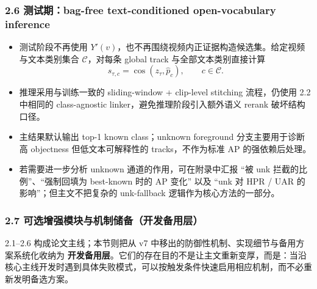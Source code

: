 \documentclass[UTF8]{ctexart}
\begin{document}
\subsubsection*{2.6 测试期：bag-free text-conditioned open-vocabulary inference}
\begin{itemize}
\item 测试阶段不再使用 $Y'(v)$，也不再围绕视频内正证据构造候选集。给定视频与文本类别集合 $\mathcal C$，对每条 global track 与全部文本类别直接计算
\[
 s_{\tau,c}=\cos(z_\tau,\hat p_c),\qquad c\in\mathcal C.
\]
\item 推理采用与训练一致的 sliding-window + clip-level stitching 流程，仍使用 2.2 中相同的 class-agnostic linker，避免推理阶段引入额外语义 rerank 破坏结构口径。
\item 主结果默认输出 top-1 known class；unknown foreground 分支主要用于诊断高 objectness 但低文本可解释性的 tracks，不作为标准 AP 的强依赖后处理。
\item 若需要进一步分析 unknown 通道的作用，可在附录中汇报 ``被 unk 拦截的比例''、``强制回填为 best-known 时的 AP 变化'' 以及 ``unk 对 HPR / UAR 的影响''；但主文不把复杂的 unk-fallback 逻辑作为核心方法的一部分。
\end{itemize}

\subsubsection*{2.7 可选增强模块与机制储备（开发备用层）}
2.1--2.6 构成论文主线；本节则把从 v7 中移出的防御性机制、实现细节与备用方案系统化收纳为 \textbf{开发备用层}。它们的存在目的不是让主文重新变厚，而是：当沿核心主线开发时遇到具体失败模式，可以按触发条件快速启用相应机制，而不必重新发明备选方案。
\end{document}
